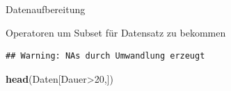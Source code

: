 \documentclass[ignorenonframetext,]{beamer}
\newenvironment{Shaded}{}{}
\newcommand{\KeywordTok}[1]{\textcolor[rgb]{0.00,0.44,0.13}{\textbf{{#1}}}}
\newcommand{\DecValTok}[1]{\textcolor[rgb]{0.25,0.63,0.44}{{#1}}}
\newcommand{\StringTok}[1]{\textcolor[rgb]{0.25,0.44,0.63}{{#1}}}
\newcommand{\NormalTok}[1]{{#1}}
\begin{document}
\begin{frame}[fragile]{Datenaufbereitung}
\begin{block}{Operatoren um Subset für Datensatz zu bekommen}
\begin{Shaded}
\end{Shaded}

\begin{verbatim}
## Warning: NAs durch Umwandlung erzeugt
\end{verbatim}

\begin{Shaded}
\begin{Highlighting}[]
\KeywordTok{head}\NormalTok{(Daten[Dauer>}\DecValTok{20}\NormalTok{,])}
\end{Highlighting}
\end{Shaded}


\end{block}
\end{frame}
\end{document}
